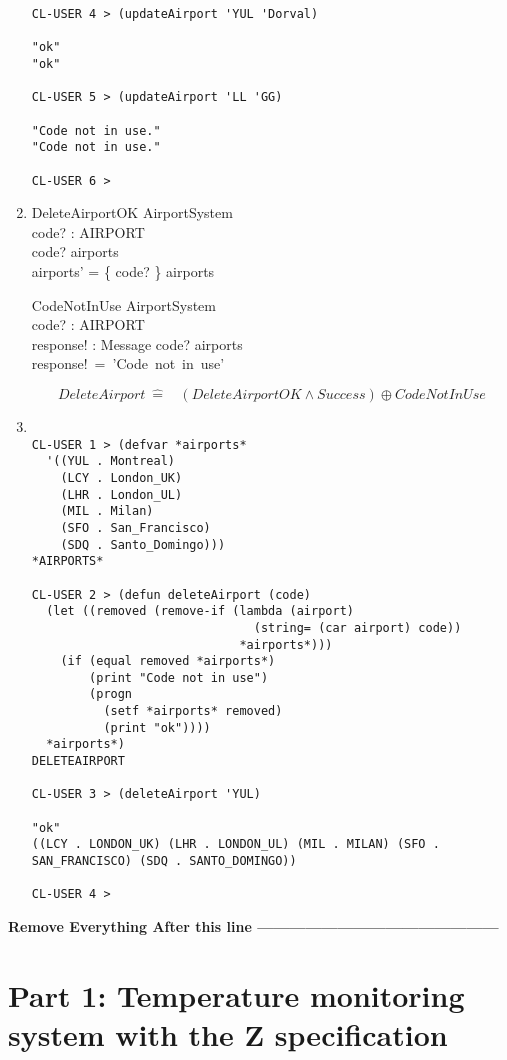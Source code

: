 \documentclass[12pt]{article}
\begin{document}
\begin{enumerate}
\begin{verbatim}
CL-USER 4 > (updateAirport 'YUL 'Dorval)

"ok" 
"ok"

CL-USER 5 > (updateAirport 'LL 'GG)

"Code not in use." 
"Code not in use."

CL-USER 6 > 
\end{verbatim}
\item
\begin{schema}{DeleteAirportOK}
\Delta AirportSystem\\
code? : AIRPORT\\
\where
code? \in \dom airports\\
airports' = \{ code? \}  \ndres airports \\
\end{schema}
\begin{schema}{CodeNotInUse}
\Xi AirportSystem\\
code? : AIRPORT\\
response! : Message
\ST
code? \notin \dom airports\\
response!~=~'Code~not~in~use'
\end{schema}
\[ DeleteAirport~\hat{=}~~~~(DeleteAirportOK\wedge Success) \oplus CodeNotInUse\]
\item
\begin{verbatim}

CL-USER 1 > (defvar *airports*
  '((YUL . Montreal)
    (LCY . London_UK)
    (LHR . London_UL)
    (MIL . Milan)
    (SFO . San_Francisco)
    (SDQ . Santo_Domingo)))
*AIRPORTS*

CL-USER 2 > (defun deleteAirport (code)
  (let ((removed (remove-if (lambda (airport)
                               (string= (car airport) code))
                             *airports*)))
    (if (equal removed *airports*)
        (print "Code not in use")
        (progn
          (setf *airports* removed)
          (print "ok"))))
  *airports*)
DELETEAIRPORT

CL-USER 3 > (deleteAirport 'YUL)

"ok" 
((LCY . LONDON_UK) (LHR . LONDON_UL) (MIL . MILAN) (SFO . SAN_FRANCISCO) (SDQ . SANTO_DOMINGO))

CL-USER 4 > 
\end{verbatim}
\end{enumerate}


\textbf{Remove Everything After this line ---------------------------------------------}\\
\newpage

\section*{Part 1:  Temperature monitoring system with the Z specification}
\end{document}
